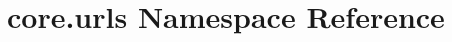 \hypertarget{namespacecore_1_1urls}{\section{core.\-urls Namespace Reference}
\label{namespacecore_1_1urls}
}
